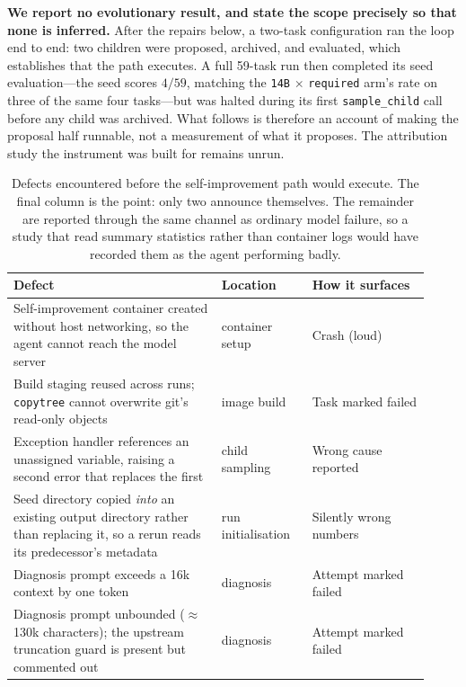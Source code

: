 \documentclass{article}
\begin{document}
\textbf{We report no evolutionary result, and state the scope precisely so
that none is inferred.} After the repairs below, a two-task configuration
ran the loop end to end: two children were proposed, archived, and
evaluated, which establishes that the path executes. A full 59-task run then
completed its seed evaluation---the seed scores $4/59$, matching the
\texttt{14B} $\times$ \texttt{required} arm's rate on three of the same four
tasks---but was halted during its first \texttt{sample\_child} call before
any child was archived. What follows is therefore an account of making the
proposal half runnable, not a measurement of what it proposes. The
attribution study the instrument was built for remains unrun.

\begin{table}[t]
\caption{Defects encountered before the self-improvement path would execute.
The final column is the point: only two announce themselves. The remainder
are reported through the same channel as ordinary model failure, so a study
that read summary statistics rather than container logs would have recorded
them as the agent performing badly.}
\label{tab:repro}
\centering
\small
\begin{tabular}{p{0.46\linewidth}p{0.20\linewidth}p{0.26\linewidth}}
\toprule
Defect & Location & How it surfaces \\
\midrule
Self-improvement container created without host networking, so the agent
cannot reach the model server &
container setup &
Crash (loud) \\
\addlinespace
Build staging reused across runs; \texttt{copytree} cannot overwrite git's
read-only objects &
image build &
Task marked failed \\
\addlinespace
Exception handler references an unassigned variable, raising a second error
that replaces the first &
child sampling &
Wrong cause reported \\
\addlinespace
Seed directory copied \emph{into} an existing output directory rather than
replacing it, so a rerun reads its predecessor's metadata &
run initialisation &
Silently wrong numbers \\
\addlinespace
Diagnosis prompt exceeds a 16k context by one token &
diagnosis &
Attempt marked failed \\
\addlinespace
Diagnosis prompt unbounded ($\approx$130k characters); the upstream
truncation guard is present but commented out &
diagnosis &
Attempt marked failed \\
\bottomrule
\end{tabular}
\end{table}
\end{document}
